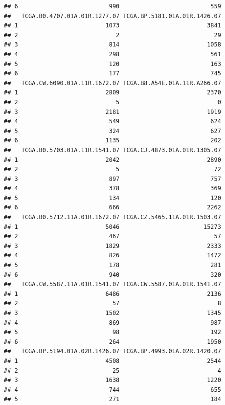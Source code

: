 \documentclass[
]{article}
\begin{document}
\begin{verbatim}
## 6                          990                          559
##   TCGA.B0.4707.01A.01R.1277.07 TCGA.BP.5181.01A.01R.1426.07
## 1                         1073                         3841
## 2                            2                           29
## 3                          814                         1058
## 4                          298                          561
## 5                          120                          163
## 6                          177                          745
##   TCGA.CW.6090.01A.11R.1672.07 TCGA.B8.A54E.01A.11R.A266.07
## 1                         2809                         2370
## 2                            5                            0
## 3                         2181                         1919
## 4                          549                          624
## 5                          324                          627
## 6                         1135                          202
##   TCGA.B0.5703.01A.11R.1541.07 TCGA.CJ.4873.01A.01R.1305.07
## 1                         2042                         2890
## 2                            5                           72
## 3                          897                          757
## 4                          378                          369
## 5                          134                          120
## 6                          666                         2262
##   TCGA.B0.5712.11A.01R.1672.07 TCGA.CZ.5465.11A.01R.1503.07
## 1                         5046                        15273
## 2                          467                           57
## 3                         1829                         2333
## 4                          826                         1472
## 5                          178                          281
## 6                          940                          320
##   TCGA.CW.5587.11A.01R.1541.07 TCGA.CW.5587.01A.01R.1541.07
## 1                         6486                         2136
## 2                           57                            8
## 3                         1502                         1345
## 4                          869                          987
## 5                           98                          192
## 6                          264                         1950
##   TCGA.BP.5194.01A.02R.1426.07 TCGA.BP.4993.01A.02R.1420.07
## 1                         4508                         2544
## 2                           25                            4
## 3                         1638                         1220
## 4                          744                          655
## 5                          271                          184

\end{verbatim}
\end{document}

